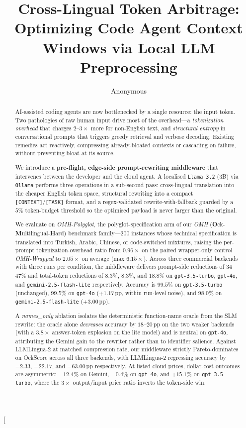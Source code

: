 \documentclass[11pt,a4paper,twocolumn]{article}
\title{\Large\textbf{Cross-Lingual Token Arbitrage: Optimizing Code Agent Context Windows via Local LLM Preprocessing}}
\author{Anonymous}
\date{}
\begin{document}
\twocolumn[
  \begin{@twocolumnfalse}
    \maketitle
    \begin{abstract}
AI-assisted coding agents are now bottlenecked by a single resource: the input token. Two pathologies of raw human input drive most of the overhead---a \textit{tokenization overhead} that charges $2$--$3\times$ more for non-English text, and \textit{structural entropy} in conversational prompts that triggers greedy retrieval and verbose decoding. Existing remedies act reactively, compressing already-bloated contexts or cascading on failure, without preventing bloat at its source.

We introduce a \textbf{pre-flight, edge-side prompt-rewriting middleware} that intervenes between the developer and the cloud agent. A localised \texttt{Llama 3.2} (3B) via \texttt{Ollama} performs three operations in a sub-second pass: cross-lingual translation into the cheaper English token space, structural rewriting into a compact \texttt{[CONTEXT]}/\texttt{[TASK]} format, and a regex-validated rewrite-with-fallback guarded by a $5\%$ token-budget threshold so the optimised payload is never larger than the original.

We evaluate on \textit{OMH-Polyglot}, the polyglot-specification arm of our \textit{OMH} (\textbf{O}ck-\textbf{M}ultilingual-\textbf{H}ard) benchmark family---$200$ instances whose technical specification is translated into Turkish, Arabic, Chinese, or code-switched mixtures, raising the per-prompt tokenization-overhead ratio from $0.96\times$ on the paired wrapper-only control \textit{OMH-Wrapped} to $2.05\times$ on average (max $6.15\times$). Across three commercial backends with three runs per condition, the middleware delivers prompt-side reductions of \textbf{$34$--$47\%$} and total-token reductions of $8.3\%$, $8.3\%$, and $18.8\%$ on \texttt{gpt-3.5-turbo}, \texttt{gpt-4o}, and \texttt{gemini-2.5-flash-lite} respectively. Accuracy is $99.5\%$ on \texttt{gpt-3.5-turbo} (unchanged), $99.5\%$ on \texttt{gpt-4o} ($+1.17$\,pp, within run-level noise), and $98.0\%$ on \texttt{gemini-2.5-flash-lite} ($+3.00$\,pp).



A \textit{names\_only} ablation isolates the deterministic function-name oracle from the SLM rewrite: the oracle alone \emph{decreases} accuracy by $18$--$20$\,pp on the two weaker backends (with a $3.8\times$ answer-token explosion on the lite model) and is neutral on \texttt{gpt-4o}, attributing the Gemini gain to the rewriter rather than to identifier salience. Against LLMLingua-2 \cite{pan2024llmlingua2} at matched compression rate, our middleware strictly Pareto-dominates on OckScore across all three backends, with LLMLingua-2 regressing accuracy by $-2.33$, $-22.17$, and $-63.00$\,pp respectively. At listed cloud prices, dollar-cost outcomes are asymmetric: $-12.4\%$ on Gemini, $-0.4\%$ on \texttt{gpt-4o}, and $+15.1\%$ on \texttt{gpt-3.5-turbo}, where the $3\times$ output/input price ratio inverts the token-side win.


\end{abstract}
\end{@twocolumnfalse}
\end{document}
